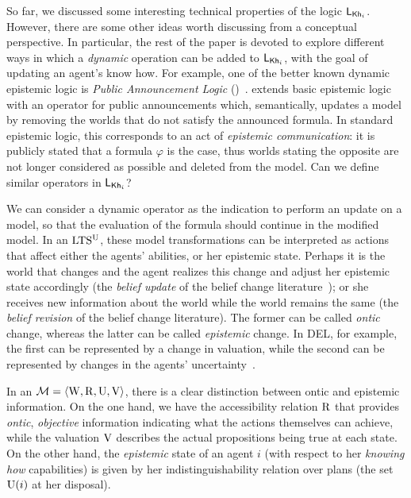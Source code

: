 So far, we discussed some interesting technical properties of the logic $\mathsf{L}_{{\sf Kh}_i}$. However, there are some other ideas worth discussing from a conceptual perspective. In particular, the rest of the paper is devoted to explore different ways in which a \emph{dynamic} operation can be added to $\mathsf{L}_{{\sf Kh}_i}$, with the goal of updating an agent's know how.   For example, one of the better known dynamic epistemic logic is \emph{Public Announcement Logic} (\PAL)~\cite{Plaza89:lopc}.  \PAL extends basic epistemic logic with an operator for public announcements which, semantically, updates a model by removing the worlds that do not satisfy the announced formula. In standard epistemic logic, this corresponds to an act of \emph{epistemic communication}: it is publicly stated that a formula $\varphi$ is the case, thus worlds stating the opposite are not longer considered as possible and deleted from the model.  Can we define similar operators in $\mathsf{L}_{{\sf Kh}_i}$?

We can consider a dynamic operator as the indication to perform an update on a model, so that the evaluation of the formula should continue in the modified model.  In an $\textup{LTS$^\text{\textup{U}}$}$, these model transformations can be interpreted as actions that affect either the agents' abilities, or her epistemic state. 
Perhaps it is the world that changes and the agent realizes this change and adjust her epistemic state accordingly (the \emph{belief update} of the belief change literature~\cite{sep-logic-belief-revision}); or she receives new information about the world while the world remains the same (the \emph{belief revision} of the belief change literature). The former can be called \emph{ontic} change, whereas the latter can be called \emph{epistemic} change. In DEL, for example, the first can be represented by a change in valuation, while the second can be represented by changes in the agents' uncertainty~\cite{vanDitmarschKooi2008}.

In an \ults $\mathcal{M}=\langle \operatorname{W},\operatorname{R},\operatorname{U},\operatorname{V} \rangle$, there is a clear distinction between ontic and epistemic information. On the one hand, we have the accessibility relation $\operatorname{R}$ that provides \emph{ontic}, \emph{objective} information indicating what the actions themselves can achieve, while the valuation $\operatorname{V}$ describes the actual propositions being true at each state. On the other hand, the \emph{epistemic} state of an agent $i$ (with respect to her \emph{knowing how} capabilities) is given by her indistinguishability relation over plans (the set $\operatorname{U}(i)$ at her disposal). 

